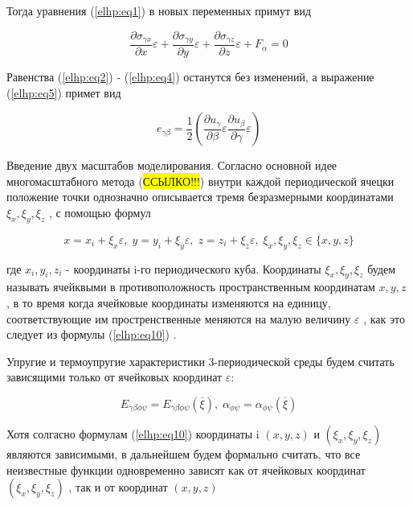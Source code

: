 Тогда уравнения 
(\ref{elhp:eq1})
в новых переменных примут вид

\begin{equation}
    \label{elhp:eq8}
    \frac{\partial \sigma_{\gamma x}}{\partial x}\varepsilon +
    \frac{\partial \sigma_{\gamma y}}{\partial y}\varepsilon +
    \frac{\partial \sigma_{\gamma z}}{\partial z}\varepsilon +
    F_{\alpha} = 0
\end{equation}

Равенства 
(\ref{elhp:eq2})
-
(\ref{elhp:eq4})
останутся без изменений, а выражение 
(\ref{elhp:eq5})
примет вид

\begin{equation}
    \label{elhp:eq9}
    e_{\gamma\beta} = \frac{1}{2}
    \left( \frac{\partial u_{\gamma}}{\partial \beta} \varepsilon \frac{\partial u_{\beta}}{\partial \gamma} \varepsilon \right) 
\end{equation}

Введение двух масштабов моделирования. Согласно основной идее многомасштабного метода (\colorbox{yellow}{ССЫЛКО!!!}) внутри каждой периодической ячецки положение
точки однозначно описывается тремя безразмерными координатами 
$\xi_x, \xi_y, \xi_z$
, с помощью формул

\begin{equation}
    \label{elhp:eq10}
    x = x_i + \xi_x \varepsilon ,\;
    y = y_i + \xi_y \varepsilon ,\;
    z = z_i + \xi_z \varepsilon ,\;
    \xi_x,\xi_y,\xi_z \in \{x,y,z\} 
\end{equation}

где
$x_i, y_i, z_i$ 
- координаты i-го периодического куба. Координаты  
$\xi_x, \xi_y, \xi_z$ 
будем называть ячейквыми в противоположность пространственным 
координатам 
$x,y,z$
, в то время когда ячейковые координаты изменяются на единицу, соответствующие им простренственные меняются на малую величину 
$\varepsilon$
, как это следует из формулы 
(\ref{elhp:eq10})
.

Упругие и термоупругие характеристики 3-периодической среды будем считать зависящими только от ячейковых координат 
$\varepsilon$:

\begin{equation}
    \label{elhp:eq11}
    E_{\gamma\beta\phi\psi} = 
    E_{\gamma\beta\phi\psi} 
    \left( \overline{\xi} \right) 
    ,\;
    \alpha_{\phi\psi} = 
    \alpha_{\phi\psi}
    \left( \overline{\xi} \right) 
\end{equation}

Хотя солгасно формулам 
(\ref{elhp:eq10})
координаты i
$ \left( x,y,z \right) $ 
и 
$ \left( \xi_x, \xi_y, \xi_z \right) $ 
являются зависимыми, в дальнейшем
будем формально считать, что все неизвестные функции
одновременно зависят как от ячейковых координат 
$ \left( \xi_x, \xi_y, \xi_z \right) $
, так и от координат 
$ \left( x,y,z \right) $

